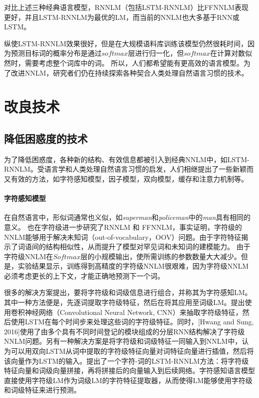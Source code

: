 \documentclass[a4paper, 12pt, twocolumn]{article}
\begin{document}
对比上述三种经典语言模型，RNNLM（包括LSTM-RNNLM）比FFNNLM表现更好，并且LSTM-RNNLM为最优的LM，而当前的NNLM也大多基于RNN或LSTM。

纵使LSTM-RNNLM效果很好，但是在大规模语料库训练该模型仍然很耗时间，因为预测目标词的概率分布是通过$softmax$层进行归一化，但$softmax$在计算对数似然时，需要考虑整个词库中的词。
所以，人们都希望能有更高效的语言模型。为了改进NNLM，研究者们仍在持续探索各种契合人类处理自然语言习惯的技术。
\section{改良技术}\label{sec:3}
\subsection{降低困惑度的技术}
为了降低困惑度，各种新的结构、有效信息都被引入到经典NNLM中，如LSTM-RNNLM。受语言学和人类处理自然语言习惯的启发，人们相继提出了一些新颖而又有效的方法，如字符感知模型，因子模型，双向模型，缓存和注意力机制等。

\paragraph{字符感知模型} 在自然语言中，形似词通常也义似，如\textit{superman}和\textit{policeman}中的\textit{man}具有相同的意义。
\cite{mikolov2012subword}也在字符级进一步研究了RNNLM 和 FFNNLM，事实证明，字符级的NNLM能够用于解决未知词（out-of-vocabulary，OOV）问题。由于字符特征揭示了词语间的结构相似性，从而提升了模型对罕见词和未知词的建模能力。
由于字符级NNLM在$Softmax$层的小规模输出，使所需训练的参数数量大大减少。但是，实验结果显示，训练得到高精度的字符级NNLM很艰难，因为字符级NNLM必须考虑更长的上下文，才能正确地预测下一个词。

很多的解决方案提出，要将字符级和词级信息进行组合，并称其为字符感知LM。其中一种方法便是，先逐词提取字符级特征，然后在将其应用至词级LM。\cite{kim2016character}提出使用卷积神经网络（Convolutional Neural Network, CNN）来抽取字符级特征，然后使用LSTM在每个时间步来处理这些词的字符级特征。同时，[Hwang and Sung, 2016]使用了由多个具有不同时间登记的模块组成的分层RNN结构解决了字符级NNLM问题。另有一种解决方案是将字符级和词级特征一同输入到NNLM中，\cite{miyamoto2016gated}认为可以用双向LSTM从词中提取的字符级特征向量对词特征向量进行插值，然后将该向量作为LSTM的输入。\cite{verwimp2017character}提出了一个字符-词的LSTM-RNNLM方法：将字符级特征向量和词级向量拼接，再将拼接后的向量输入到后续网络。字符感知语言模型直接使用字符级LM作为词级LM的字符特征提取器，从而使得LM能够使用字符级和词级特征来进行预测。
\end{document}
